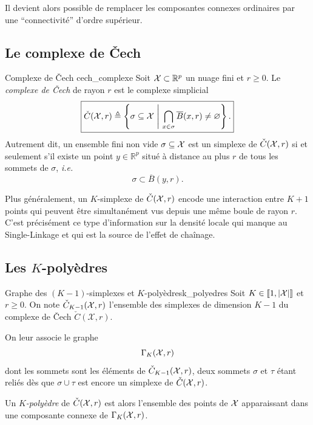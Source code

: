 Il devient alors possible de remplacer les composantes connexes ordinaires par une ``connectivité'' d'ordre supérieur.

\subsection{Le complexe de \v Cech}

\begin{Definition}{Complexe de \v Cech \cite{Cech1932, Munkres, BoissonnatChazalYvinec}}{cech_complexe}
Soit $\mathcal{X}\subset \mathbb R^p$ un nuage fini et $r\ge 0$. Le \emph{complexe de \v Cech} de rayon $r$ est le complexe simplicial
\[
\boxed{
    \check C(\X,r) \eqdef \left\{\sigma\subseteq \X \ \middle|\  \bigcap_{x\in \sigma}\overline B(x,r)\neq \varnothing \right\}.
    }
\]
Autrement dit, un ensemble fini non vide $\sigma\subseteq \mathcal{X}$ est un simplexe de $\check C(\mathcal{X},r)$ si et seulement s'il existe un point $y\in\mathbb R^p$ situé à distance au plus $r$ de tous les sommets de $\sigma$, \emph{i.e.}
\[
\sigma \subset \overline B(y,r).
\]
\end{Definition}



Plus généralement, un $K$-simplexe de $\check C(\mathcal{X},r)$ encode une interaction entre $K+1$ points qui peuvent être simultanément vus depuis une même boule de rayon $r$. C'est précisément ce type d'information sur la densité locale qui manque au Single-Linkage et qui est la source de l'effet de chaînage.

\subsection{Les $K$-polyèdres}

\begin{Definition}{Graphe des $(K-1)$-simplexes et $K$-polyèdres}{k_polyedres}
Soit $K\in \left[\!\left[ 1,|\mathcal{X}| \right]\!\right]$ et $r\ge 0$. On note $\check C_{K-1}(\mathcal{X},r)$ l'ensemble des simplexes de dimension $K-1$ du complexe de \v Cech $\check C(\mathcal X, r)$.

On leur associe le graphe
\[
    \Gamma_K(\mathcal{X},r)
\]
dont les sommets sont les éléments de $\check C_{K-1}(\mathcal{X},r)$, deux sommets $\sigma$ et $\tau$ étant reliés dès que $\sigma\cup\tau$ est encore un simplexe de $\check C(\mathcal{X},r)$.

Un \emph{$K$-polyèdre} de $\check C(\mathcal{X},r)$ est alors l'ensemble des points de $\mathcal{X}$ apparaissant dans une composante connexe de $\Gamma_K(\mathcal{X},r)$.
\end{Definition}

